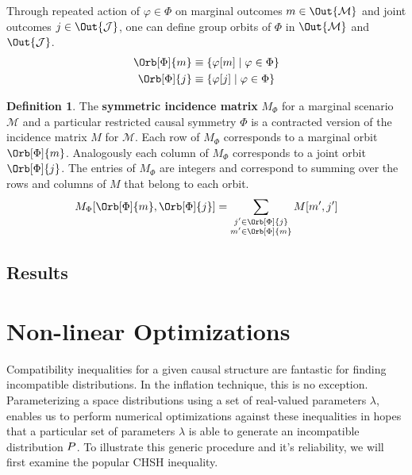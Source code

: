 \documentclass[aps, 10pt, english, twoside, pra, nofootinbib, longbibliography]{revtex4-1}
\theoremstyle{plain}
\theoremstyle{definition}
\newtheorem{definition}[theorem]{Definition}
\theoremstyle{remark}
\newcommand{\gelem}{\varphi}
\newcommand{\action}[1]{\gelem\bs{#1}}
\newcommand{\mscenario}{\mathcal{M}}
\newcommand{\jointvar}{\mathcal{J}}
\newcommand{\term}[1]{\textcolor{Mahogany}{\textbf{#1}}}
\begin{document}
    Through repeated action of $\gelem \in \Phi$ on marginal outcomes $m \in \Out{\mscenario}$ and joint outcomes $j \in \Out{\jointvar}$, one can define group orbits of $\Phi$ in $\Out{\mscenario}$ and $\Out{\jointvar}$.
    \begin{align*}
        \Orb[\Phi]{m} &\defined \bc{\action{m} \mid \gelem \in \Phi} \\
        \Orb[\Phi]{j} &\defined \bc{\action{j} \mid \gelem \in \Phi}
    \end{align*}

    \begin{definition}
        The \term{symmetric incidence matrix} $M_{\Phi}$ for a marginal scenario $\mscenario$ and a particular restricted causal symmetry $\Phi$ is a contracted version of the incidence matrix $M$ for $\mscenario$. Each row of $M_{\Phi}$ corresponds to a marginal orbit $\Orb[\Phi]{m}$. Analogously each column of $M_{\Phi}$ corresponds to a joint orbit $\Orb[\Phi]{j}$. The entries of $M_{\Phi}$ are integers and correspond to summing over the rows and columns of $M$ that belong to each orbit.
        \[ M_{\Phi}\bs{\Orb[\Phi]{m}, \Orb[\Phi]{j}} = \sum_{\substack{j' \in \Orb[\Phi]{j} \\ m' \in \Orb[\Phi]{m}}} M\bs{m',j'} \]
    \end{definition}

    \subsection{Results}


    \section{Non-linear Optimizations}
    \label{sec:optimizations}
    Compatibility inequalities for a given causal structure are fantastic for finding incompatible distributions. In the inflation technique, this is no exception. Parameterizing a space distributions using a set of real-valued parameters $\lambda$, enables us to perform numerical optimizations against these inequalities in hopes that a particular set of parameters $\lambda$ is able to generate an incompatible distribution $\prob$. To illustrate this generic procedure and it's reliability, we will first examine the popular CHSH inequality.
\end{document}
